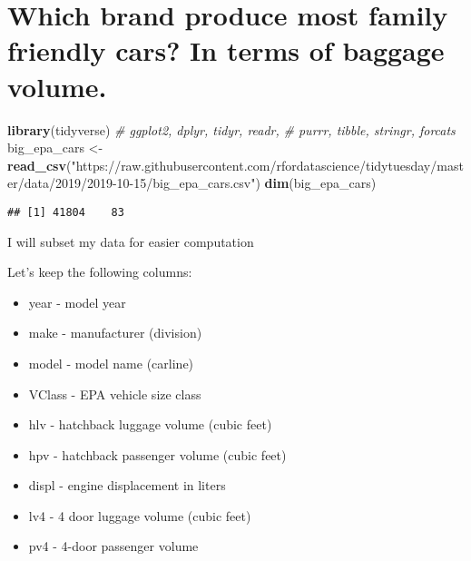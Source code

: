 \documentclass[]{article}
\newenvironment{Shaded}{\begin{snugshade}}{\end{snugshade}}
\newcommand{\CommentTok}[1]{\textcolor[rgb]{0.56,0.35,0.01}{\textit{#1}}}
\newcommand{\KeywordTok}[1]{\textcolor[rgb]{0.13,0.29,0.53}{\textbf{#1}}}
\newcommand{\NormalTok}[1]{#1}
\newcommand{\OperatorTok}[1]{\textcolor[rgb]{0.81,0.36,0.00}{\textbf{#1}}}
\newcommand{\StringTok}[1]{\textcolor[rgb]{0.31,0.60,0.02}{#1}}
\providecommand{\tightlist}{%
  \setlength{\itemsep}{0pt}\setlength{\parskip}{0pt}}
\begin{document}
\hypertarget{which-brand-produce-most-family-friendly-cars-in-terms-of-baggage-volume.}{%
\section{Which brand produce most family friendly cars? In terms of
baggage
volume.}\label{which-brand-produce-most-family-friendly-cars-in-terms-of-baggage-volume.}}

\begin{Shaded}
\begin{Highlighting}[]
\KeywordTok{library}\NormalTok{(tidyverse) }\CommentTok{# ggplot2, dplyr, tidyr, readr, }
                   \CommentTok{# purrr, tibble, stringr, forcats}
\NormalTok{big_epa_cars <-}\StringTok{ }\KeywordTok{read_csv}\NormalTok{(}\StringTok{"https://raw.githubusercontent.com/rfordatascience/tidytuesday/master/data/2019/2019-10-15/big_epa_cars.csv"}\NormalTok{)}
\KeywordTok{dim}\NormalTok{(big_epa_cars)}
\end{Highlighting}
\end{Shaded}

\begin{verbatim}
## [1] 41804    83
\end{verbatim}

I will subset my data for easier computation

Let's keep the following columns:

\begin{itemize}
\tightlist
\item
  year - model year
\item
  make - manufacturer (division)
\item
  model - model name (carline)
\item
  VClass - EPA vehicle size class
\item
  hlv - hatchback luggage volume (cubic feet)
\item
  hpv - hatchback passenger volume (cubic feet)
\item
  displ - engine displacement in liters
\item
  lv4 - 4 door luggage volume (cubic feet)
\item
  pv4 - 4-door passenger volume
\end{itemize}

\begin{Shaded}
\end{Shaded}
\end{document}
